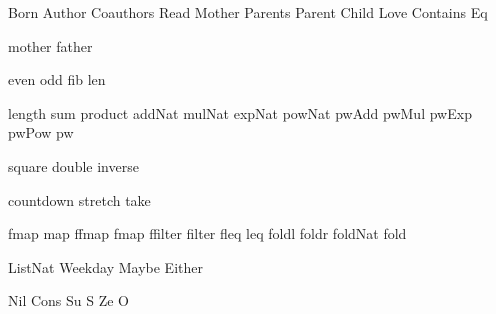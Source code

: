 
\DefRel Born
\DefRel Author
\DefRel Coauthors
\DefRel Read
\DefRel Mother
\DefRel Parents
\DefRel Parent
\DefRel Child
\DefRel Love
\DefRel Contains
\DefRel Eq

\DefFun mother
\DefFun father

\DefFun even
\DefFun odd
\DefFun fib
\DefFun len

\DefFpf length
\DefFpf sum
\DefFpf product
\DefFpf addNat
\DefFpf mulNat
\DefFpf expNat
\DefFpf powNat
\DefFpf pwAdd
\DefFpf pwMul
\DefFpf pwExp
\DefFpf pwPow
\DefFpf pw

\DefFpf square
\DefFpf double
\DefFpf inverse

\DefFpf countdown
\DefFpf stretch
\DefFpf take

\DefFPF fmap    map
\DefFPF ffmap   fmap
\DefFPF ffilter filter
\DefFPF fleq    leq
\DefFpf foldl
\DefFpf foldr
\DefFpf foldNat
\DefFpf fold

\DefType ListNat
\DefType Weekday
\DefType Maybe
\DefType Either

\DefCons Nil
\DefCons Cons
\DefCONS Su S
\DefCONS Ze O


\def\bla{\mathrm{bla}}
\def\blu{\mathrm{blu}}

\def\persons{{\cal P}}
\let\pers=\persons

\def\euclid{\algorithmstylize{Euclid}}%

\def\Smile{\rel{\woohoo}}
\def\Frown{\rel{\boohoo}}

\def\oddAs#1{A_{[#1]}}

